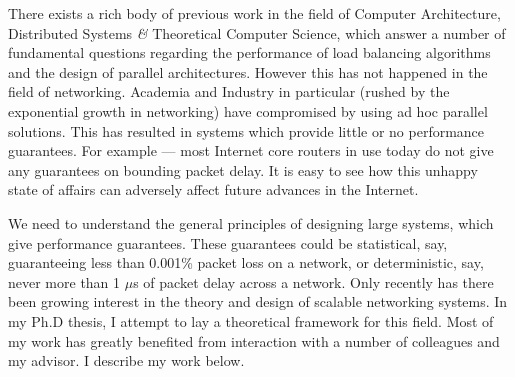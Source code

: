 \documentclass[11pt, a4paper]{article}
\begin{document}
\begin{small}


There exists a rich body of previous work in the field of Computer Architecture, 
Distributed Systems {\it \&}  Theoretical Computer Science, which answer a number of 
fundamental questions regarding the performance of load balancing algorithms and 
the design of parallel architectures.
However this has not happened in the field of networking. 
Academia and Industry in particular (rushed by the exponential growth in networking) 
have compromised by using ad hoc parallel solutions. This has resulted in systems
which provide little or no performance guarantees.
For example --- most Internet core routers in use today do not give any 
guarantees on bounding packet delay.
It is easy to see how this unhappy state of affairs can adversely affect 
future advances in the Internet.

We need to understand the general principles of designing large systems,
which give performance guarantees. These guarantees could be statistical, say, guaranteeing less
than 0.001\% packet loss on a network, or deterministic, say, never more than 1 $\mu$s of packet
delay across a network. Only recently has there been growing interest in the 
theory and design of scalable networking systems.
In my Ph.D thesis, I attempt to lay a theoretical framework for this field.
Most of my work has greatly benefited from interaction with a number of colleagues and my advisor.
I describe my work below.




\end{small}
\end{document}
